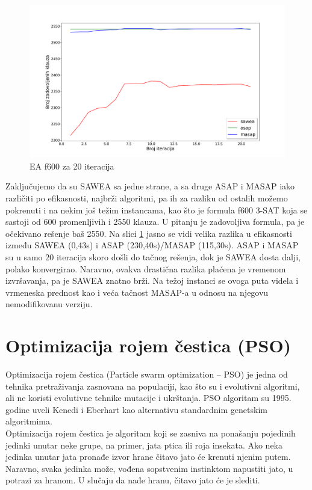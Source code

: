 \documentclass[a4paper]{article}
\begin{document}
\begin{figure}[h!]
\centering
\includegraphics[width=\textwidth]{f600-sawea-asap-masap.png}
\caption{EA f600 za 20 iteracija}\label{img:ea_f600}
\end{figure}

Zaključujemo da su SAWEA sa jedne strane, a sa druge ASAP i MASAP iako različiti 
po efikasnosti, najbrži algoritmi, 
pa ih za razliku od ostalih možemo pokrenuti i na nekim još težim instancama, kao što 
je formula f600 3-SAT koja se sastoji od 600 promenljivih i 2550 klauza. U pitanju je 
zadovoljiva formula, pa je očekivano rešenje baš 2550. Na slici \ref{img:ea_f600}
jasno se vidi velika razlika u efikasnosti između SAWEA (0,43s) i 
ASAP (230,40s)/MASAP (115,30s).
ASAP i MASAP su u samo 20 iteracija skoro došli do tačnog rešenja, dok je SAWEA dosta dalji,
polako konvergirao. Naravno, ovakva drastična razlika plaćena je vremenom izvršavanja,
pa je SAWEA znatno brži. Na težoj instanci se ovoga puta videla i vrmeneska prednost kao i
veća tačnost MASAP-a u odnosu na njegovu nemodifikovanu verziju.


\newpage


\section{Optimizacija rojem čestica (PSO)}
\label{sec:pso}
Optimizacija rojem čestica (Particle swarm optimization – PSO) \cite{PSO_Russell} 
je jedna od tehnika pretraživanja zasnovana na populaciji, kao što su i 
evolutivni algoritmi, ali ne koristi evolutivne tehnike mutacije i ukrštanja.
PSO algoritam su 1995. godine uveli Kenedi i Eberhart kao 
alternativu standardnim genetskim algoritmima. \\

Optimizacija rojem čestica je algoritam koji se zasniva na ponašanju pojedinih jedinki
unutar neke grupe, na primer, jata ptica ili roja insekata. Ako neka jedinka
unutar jata pronađe izvor hrane čitavo jato će krenuti njenim putem. Naravno, svaka 
jedinka može, vođena sopstvenim instinktom napustiti jato, u potrazi za hranom.
U slučaju da nađe hranu, čitavo jato će je slediti. \\
\end{document}
